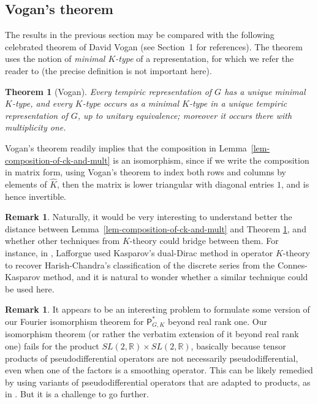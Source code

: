 \documentclass[leqno,11pt]{amsart}
\numberwithin{equation}{subsection}
\theoremstyle{plain}
\newtheorem{theorem}[equation]{Theorem}
\theoremstyle{definition}
\newtheorem{remark}[equation]{Remark}
\theoremstyle{remark}
\newcommand{\R}{\mathbb{R}}
\newcommand{\PSDO}{\mathsf{P}}
\begin{document}
\subsection{Vogan's theorem}
The results in the previous section may be compared with the following celebrated theorem of David Vogan (see Section~1 for references).  The theorem uses the notion of \emph{minimal $K$-type} of a representation, for which we refer the reader to \cite{VoganGreenBook} (the precise definition is not important here).  


\begin{theorem}[Vogan]
\label{thm-vogan-min-k-type-bijection}
Every tempiric representation of $G$ has a unique minimal $K$-type, and every $K$-type occurs as a minimal $K$-type  in a unique tempiric representation of $G$, up to unitary equivalence; moreover it occurs there with multiplicity one.
\end{theorem}

Vogan's theorem readily implies that the composition in Lemma~\ref{lem-composition-of-ck-and-mult} is an isomorphism, since if we write the composition  in matrix form,  using Vogan's theorem to index both rows and columns by elements of $\widehat K$, then the matrix is lower triangular with diagonal entries $1$, and is hence invertible.  

\begin{remark}
Naturally, it would be very interesting to understand better the distance between Lemma~\ref{lem-composition-of-ck-and-mult} and Theorem \ref{thm-vogan-min-k-type-bijection}, and whether other techniques from $K$-theory could bridge between them.  For instance, in \cite{Lafforgue02ICM}, Lafforgue used Kasparov's dual-Dirac method in operator $K$-theory \cite{Kasparov88} to recover Harish-Chandra's classification of the discrete series from the Connes-Kasparov method, and it is natural to wonder whether a similar technique could be used here. 
\end{remark}

\begin{remark}
It appears to be an interesting  problem to formulate some version of our Fourier isomorphism theorem  for $\PSDO^*_{G,K}$ beyond real rank one. Our isomorphism theorem (or rather the verbatim extension of it beyond real rank one) fails for the product $SL(2,\R){\times} SL(2,\R)$, basically because tensor products of pseudodifferential operators are not necessarily pseudodifferential, even when one of the factors is a smoothing operator.  This can be likely  
remedied by using variants of pseudodifferential operators that are adapted to products, as in \cite{Rodino75}.  But it is a  challenge to go  further.
\end{remark} 





\end{document}
